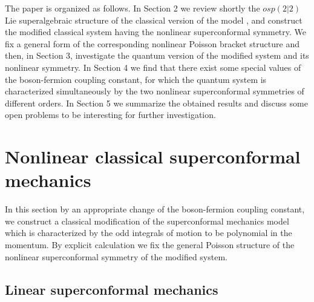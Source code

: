 \documentclass[a4paper,12pt]{article}
\begin{document}
The paper is organized as follows.
In Section 2 we review shortly the
$osp(2|2)$ Lie superalgebraic structure
of the classical version of the model
\cite{AP,FR}, and construct
the modified classical system
having the nonlinear superconformal symmetry.
We fix a general form of the corresponding
nonlinear Poisson bracket structure and then,
in Section 3, investigate
the quantum version of the modified system
and its nonlinear symmetry.
In Section 4 we find that there exist some
special values of the boson-fermion coupling
constant, for which the quantum system
is characterized simultaneously by
the two nonlinear superconformal symmetries
of different orders. In Section 5
we summarize the obtained results
and discuss some open problems to be interesting
for further investigation.



\section{Nonlinear classical superconformal mechanics}

In this section by an appropriate
change of the boson-fermion coupling constant,
we construct a classical modification of the
superconformal mechanics model
\cite{AP,FR} which is characterized by the odd integrals of
motion
to be polynomial in the momentum.
By explicit calculation we fix the
general Poisson structure
of the nonlinear superconformal symmetry
of the modified system.


\subsection{Linear superconformal mechanics}
\end{document}
